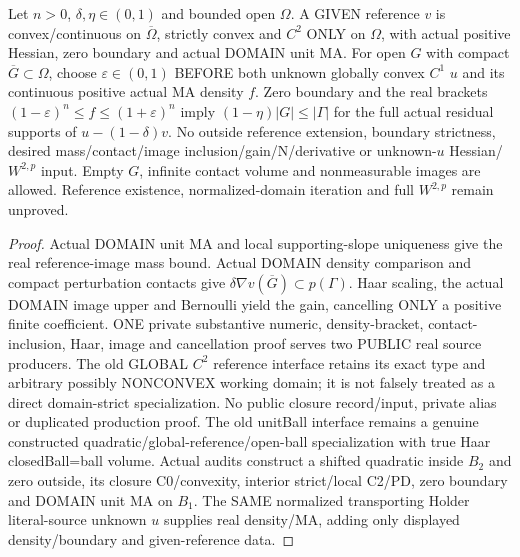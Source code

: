 \begin{lemma}
  \label{lem:convex-reference-contact-gain}
  \leanok
  Let $n>0$, $\delta,\eta\in(0,1)$ and bounded open $\Omega$. A GIVEN reference
  $v$ is convex/continuous on $\overline\Omega$, strictly convex and $C^2$ ONLY
  on $\Omega$, with actual positive Hessian, zero boundary and actual DOMAIN
  unit MA. For open $G$ with compact $\overline G\subset\Omega$, choose
  $\varepsilon\in(0,1)$ BEFORE both unknown globally convex $C^1$ $u$ and its
  continuous positive actual MA density $f$. Zero boundary and the real brackets
  $(1-\varepsilon)^n\le f\le(1+\varepsilon)^n$ imply
  $(1-\eta)|G|\le|\Gamma|$ for the full actual residual supports of $u-(1-\delta)v$.
  No outside reference extension, boundary strictness, desired mass/contact/image
  inclusion/gain/N/derivative or unknown-$u$ Hessian/$W^{2,p}$ input. Empty $G$,
  infinite contact volume and nonmeasurable images are allowed. Reference
  existence, normalized-domain iteration and full $W^{2,p}$ remain unproved.
\end{lemma}
\begin{proof}
  \leanok
  Actual DOMAIN unit MA and local supporting-slope uniqueness give the real
  reference-image mass bound. Actual DOMAIN density comparison and compact
  perturbation contacts give $\delta\nabla v(\overline G)\subset p(\Gamma)$.
  Haar scaling, the actual DOMAIN image upper and Bernoulli yield the gain,
  cancelling ONLY a positive finite coefficient. ONE private substantive numeric,
  density-bracket, contact-inclusion, Haar, image and cancellation proof serves
  two PUBLIC real source producers. The old GLOBAL $C^2$ reference interface
  retains its exact type and arbitrary possibly NONCONVEX working domain; it is
  not falsely treated as a direct domain-strict specialization. No public closure
  record/input, private alias or duplicated production proof. The old unitBall
  interface remains a genuine constructed quadratic/global-reference/open-ball
  specialization with true Haar closedBall=ball volume. Actual audits construct
  a shifted quadratic inside $B_2$ and zero outside, its closure C0/convexity,
  interior strict/local C2/PD, zero boundary and DOMAIN unit MA on $B_1$.
  The SAME normalized transporting Holder literal-source unknown $u$ supplies
  real density/MA, adding only displayed density/boundary and given-reference data.
\end{proof}


